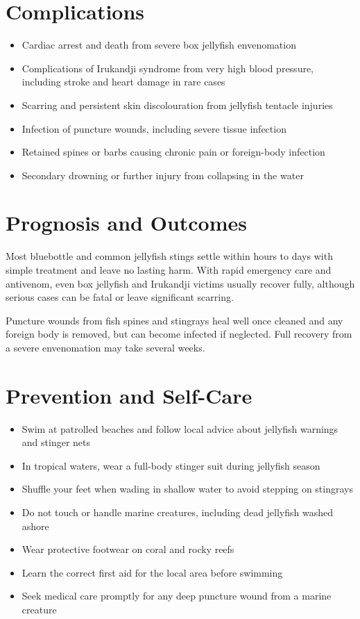 \section*{Complications}
\begin{itemize}
    \item Cardiac arrest and death from severe box jellyfish envenomation
    \item Complications of Irukandji syndrome from very high blood pressure, including stroke and heart damage in rare cases
    \item Scarring and persistent skin discolouration from jellyfish tentacle injuries
    \item Infection of puncture wounds, including severe tissue infection
    \item Retained spines or barbs causing chronic pain or foreign-body infection
    \item Secondary drowning or further injury from collapsing in the water
\end{itemize}

\section*{Prognosis and Outcomes}
Most bluebottle and common jellyfish stings settle within hours to days with simple treatment and leave no lasting harm. With rapid emergency care and antivenom, even box jellyfish and Irukandji victims usually recover fully, although serious cases can be fatal or leave significant scarring.

Puncture wounds from fish spines and stingrays heal well once cleaned and any foreign body is removed, but can become infected if neglected. Full recovery from a severe envenomation may take several weeks.

\section*{Prevention and Self-Care}
\begin{itemize}
    \item Swim at patrolled beaches and follow local advice about jellyfish warnings and stinger nets
    \item In tropical waters, wear a full-body stinger suit during jellyfish season
    \item Shuffle your feet when wading in shallow water to avoid stepping on stingrays
    \item Do not touch or handle marine creatures, including dead jellyfish washed ashore
    \item Wear protective footwear on coral and rocky reefs
    \item Learn the correct first aid for the local area before swimming
    \item Seek medical care promptly for any deep puncture wound from a marine creature
\end{itemize}

